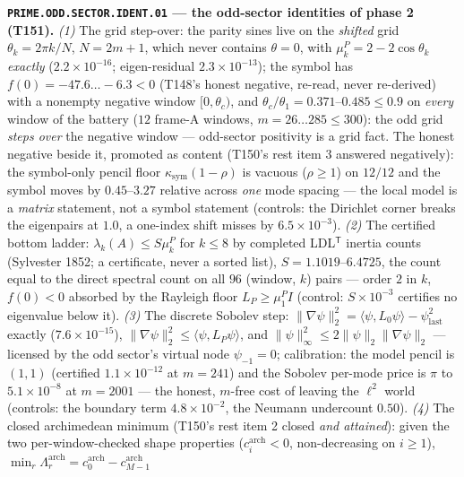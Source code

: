 \par\smallskip\noindent\textbf{\texttt{PRIME.ODD.SECTOR.IDENT.01} --- the
odd-sector identities of phase 2 (T151).}
\emph{(1)} The grid step-over: the parity sines live on the \emph{shifted}
grid $\theta_k=2\pi k/N$, $N=2m{+}1$, which never contains $\theta=0$, with
$\mu^P_k=2-2\cos\theta_k$ \emph{exactly} ($2.2\times10^{-16}$;
eigen-residual $2.3\times10^{-13}$); the symbol has
$f(0)=-47.6\ldots-6.3<0$ (T148's honest negative, re-read, never
re-derived) with a nonempty negative window $[0,\theta_c)$, and
$\theta_c/\theta_1=0.371$--$0.485\le0.9$ on \emph{every} window of the
battery ($12$ frame-A windows, $m=26\ldots285\le300$): the odd grid
\emph{steps over} the negative window --- odd-sector positivity is a grid
fact. The honest negative beside it, promoted as content (T150's rest item
3 answered negatively): the symbol-only pencil floor
$\kappa_{\mathrm{sym}}(1-\rho)$ is vacuous ($\rho\ge1$) on $12/12$ and the
symbol moves by $0.45$--$3.27$ relative across \emph{one} mode spacing ---
the local model is a \emph{matrix} statement, not a symbol statement
(controls: the Dirichlet corner breaks the eigenpairs at $1.0$, a one-index
shift misses by $6.5\times10^{-3}$). \emph{(2)} The certified bottom
ladder: $\lambda_k(A)\le S\mu^P_k$ for $k\le8$ by completed
LDL$^{\mathsf T}$ inertia counts (Sylvester 1852; a certificate, never a
sorted list), $S=1.1019$--$6.4725$, the count equal to the direct spectral
count on all $96$ (window, $k$) pairs --- order $2$ in $k$, $f(0)<0$
absorbed by the Rayleigh floor $L_P\ge\mu^P_1I$ (control:
$S\times10^{-3}$ certifies no eigenvalue below it). \emph{(3)} The discrete
Sobolev step: $\|\nabla\psi\|_2^2=\langle\psi,L_0\psi\rangle-
\psi_{\mathrm{last}}^2$ exactly ($7.6\times10^{-15}$),
$\|\nabla\psi\|_2^2\le\langle\psi,L_P\psi\rangle$, and
$\|\psi\|_\infty^2\le2\|\psi\|_2\|\nabla\psi\|_2$ --- licensed by the odd
sector's virtual node $\psi_{-1}=0$; calibration: the model pencil is
$(1,1)$ (certified $1.1\times10^{-12}$ at $m=241$) and the Sobolev
per-mode price is $\pi$ to $5.1\times10^{-8}$ at $m=2001$ --- the honest,
$m$-free cost of leaving the $\ell^2$ world (controls: the boundary term
$4.8\times10^{-2}$, the Neumann undercount $0.50$). \emph{(4)} The closed
archimedean minimum (T150's rest item 2 closed \emph{and attained}): given
the two per-window-checked shape properties ($c^{\mathrm{arch}}_i<0$,
non-decreasing on $i\ge1$),
$\min_r\Lambda^{\mathrm{arch}}_r=c^{\mathrm{arch}}_0-c^{\mathrm{arch}}_{M-1}$
